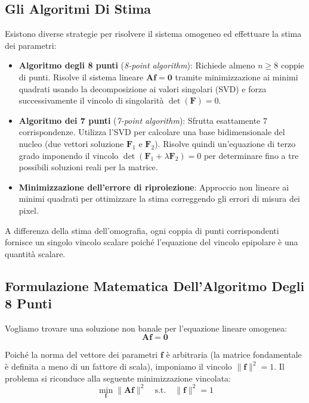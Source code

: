﻿\documentclass[11pt, a4paper]{article}
\begin{document}
\subsection{Gli Algoritmi Di Stima}

Esistono diverse strategie per risolvere il sistema omogeneo ed effettuare la stima dei parametri:
\begin{itemize}[noitemsep]
    \item \textbf{Algoritmo degli 8 punti} (\emph{8-point algorithm}): Richiede almeno $n \ge 8$ coppie di punti. Risolve il sistema lineare $\bm{A}\bm{f} = \bm{0}$ tramite minimizzazione ai minimi quadrati usando la decomposizione ai valori singolari (SVD) e forza successivamente il vincolo di singolarità $\det(\bm{F}) = 0$.
    \item \textbf{Algoritmo dei 7 punti} (\emph{7-point algorithm}): Sfrutta esattamente $7$ corrispondenze. Utilizza l'SVD per calcolare una base bidimensionale del nucleo (due vettori soluzione $\bm{F}_1$ e $\bm{F}_2$). Risolve quindi un'equazione di terzo grado imponendo il vincolo $\det(\bm{F}_1 + \lambda \bm{F}_2) = 0$ per determinare fino a tre possibili soluzioni reali per la matrice.
    \item \textbf{Minimizzazione dell'errore di riproiezione}: Approccio non lineare ai minimi quadrati per ottimizzare la stima correggendo gli errori di misura dei pixel.
\end{itemize}

A differenza della stima dell'omografia, ogni coppia di punti corrispondenti fornisce un singolo vincolo scalare poiché l'equazione del vincolo epipolare è una quantità scalare.



\subsection{Formulazione Matematica Dell'Algoritmo Degli 8 Punti}

Vogliamo trovare una soluzione non banale per l'equazione lineare omogenea:
\[
\bm{A}\bm{f} = \bm{0}
\]

Poiché la norma del vettore dei parametri $\bm{f}$ è arbitraria (la matrice fondamentale è definita a meno di un fattore di scala), imponiamo il vincolo $\lVert\bm{f}\rVert^2 = 1$. Il problema si riconduce alla seguente minimizzazione vincolata:
\begin{equation}
\min_{\bm{f}} \lVert\bm{A}\bm{f}\rVert^2 \quad \text{s.t.} \quad \lVert\bm{f}\rVert^2 = 1
\end{equation}
\end{document}
